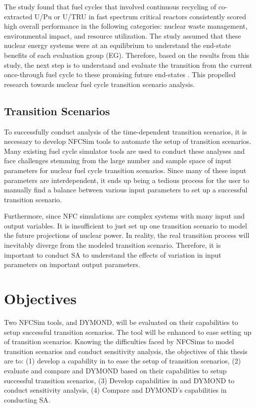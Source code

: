 The study found that fuel cycles that involved continuous recycling
of co-extracted U/Pu or U/TRU in fast spectrum critical reactors
consistently scored high overall performance in the following 
categories: nuclear waste management, environmental impact, 
and resource utilization. 
The study assumed that 
these nuclear energy systems were at an equilibrium to understand 
the end-state benefits of each evaluation group (EG). 
Therefore, based on the results from this study, the next step is 
to understand and evaluate the transition from the current 
once-through fuel cycle to these promising 
future end-states \cite{feng_standardized_2016}. 
This propelled research towards nuclear fuel cycle transition 
scenario analysis. 

\subsection{Transition Scenarios}
To successfully conduct analysis of the time-dependent transition
scenarios, it is necessary to develop \gls{NFCSim} tools to  
automate the setup of transition scenarios. 
Many existing fuel cycle simulator tools are used to conduct 
these analyses and face challenges stemming from the large 
number and sample space of input 
parameters for nuclear fuel cycle transition scenarios.
Since many of these input parameters are interdependent, it ends
up being a tedious process for the user to manually find a balance 
between various input parameters to set up a successful transition 
scenario. 

Furthermore, since \gls{NFC} simulations are complex systems with 
many input and output variables. 
It is insufficient to just set up one transition scenario to model 
the future projections of nuclear power. 
In reality, the real transition process will 
inevitably diverge from the modeled transition scenario. 
Therefore, it is important to conduct \gls{SA} to understand 
the effects of variation in input parameters on 
important output parameters. 

\section{Objectives}
Two \gls{NFCSim} tools, \Cyclus and DYMOND, will be evaluated on 
their capabilities to setup successful transition scenarios. 
The \Cyclus tool will be enhanced to ease setting up of 
transition scenarios. 
Knowing the difficulties faced by \glspl{NFCSim} to model 
transition scenarios and conduct sensitivity analysis, 
the objectives of this thesis are to: 
(1) develop a capability in \Cyclus to ease the setup of 
transition scenarios, 
(2) evaluate and compare \Cyclus and 
DYMOND based on their capabilities to setup 
successful transition scenarios,
(3) Develop capabilities in \Cyclus and DYMOND to conduct 
sensitivity analysis,
(4) Compare \Cyclus and DYMOND's capabilities in conducting \gls{SA}. 